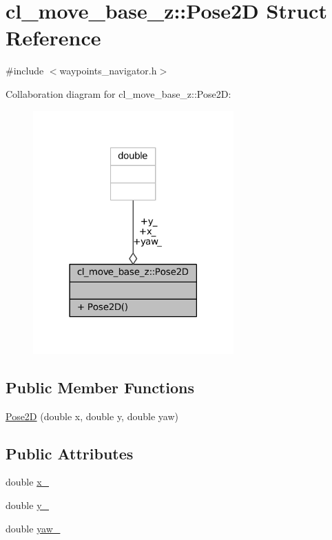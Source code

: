 \hypertarget{structcl__move__base__z_1_1Pose2D}{}\section{cl\+\_\+move\+\_\+base\+\_\+z\+:\+:Pose2D Struct Reference}
\label{structcl__move__base__z_1_1Pose2D}


{\ttfamily \#include $<$waypoints\+\_\+navigator.\+h$>$}



Collaboration diagram for cl\+\_\+move\+\_\+base\+\_\+z\+:\+:Pose2D\+:
\nopagebreak
\begin{figure}[H]
\begin{center}
\leavevmode
\includegraphics[width=218pt]{structcl__move__base__z_1_1Pose2D__coll__graph}
\end{center}
\end{figure}
\subsection*{Public Member Functions}
\begin{DoxyCompactItemize}
\item 
\hyperlink{structcl__move__base__z_1_1Pose2D_ac84fa69c2c2dda7ec107a52e9f2c2fcf}{Pose2D} (double x, double y, double yaw)
\end{DoxyCompactItemize}
\subsection*{Public Attributes}
\begin{DoxyCompactItemize}
\item 
double \hyperlink{structcl__move__base__z_1_1Pose2D_a5cf116d8264305c3cf062e573f218854}{x\+\_\+}
\item 
double \hyperlink{structcl__move__base__z_1_1Pose2D_a745b752ce659fca634aaa386230bb931}{y\+\_\+}
\item 
double \hyperlink{structcl__move__base__z_1_1Pose2D_aed88c69c4fb64fdca72534843de5350e}{yaw\+\_\+}
\end{DoxyCompactItemize}


